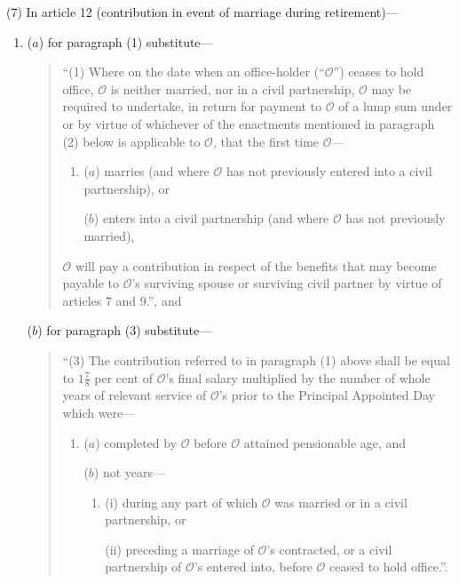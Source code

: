 \documentclass[12pt,a4paper]{article}
\begin{document}
(7) In article 12 (contribution in event of marriage during retirement)—
\begin{enumerate}\item[]
($a$) for paragraph (1) substitute—
\begin{quotation}
“(1) Where on the date when an office-holder (“$\mathcal{O}$”) ceases to hold office, $\mathcal{O}$ is neither married, nor in a civil partnership, $\mathcal{O}$ may be required to undertake, in return for payment to $\mathcal{O}$ of a lump sum under or by virtue of whichever of the enactments mentioned in paragraph (2) below is applicable to $\mathcal{O}$, that the first time $\mathcal{O}$—
\begin{enumerate}\item[]
($a$) marries (and where $\mathcal{O}$ has not previously entered into a civil partnership), or

($b$) enters into a civil partnership (and where $\mathcal{O}$ has not previously married),
\end{enumerate}
$\mathcal{O}$ will pay a contribution in respect of the benefits that may become payable to $\mathcal{O}$’s surviving spouse or surviving civil partner by virtue of articles 7 and 9.”, and
\end{quotation}

($b$) for paragraph (3) substitute—
\begin{quotation}
“(3) The contribution referred to in paragraph (1) above shall be equal to $1\frac{7}{8}$ per cent of $\mathcal{O}$’s final salary multiplied by the number of whole years of relevant service of $\mathcal{O}$’s prior to the Principal Appointed Day which were—
\begin{enumerate}\item[]
($a$) completed by $\mathcal{O}$ before $\mathcal{O}$ attained pensionable age, and

($b$) not years—
\begin{enumerate}\item[]
(i) during any part of which $\mathcal{O}$ was married or in a civil partnership, or

(ii) preceding a marriage of $\mathcal{O}$’s contracted, or a civil partnership of $\mathcal{O}$’s entered into, before $\mathcal{O}$ ceased to hold office.”.
\end{enumerate}
\end{enumerate}
\end{quotation}
\end{enumerate}
\end{document}
